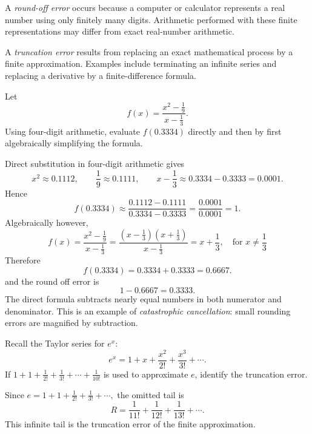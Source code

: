 \begin{definition}
A \emph{round-off error} occurs because a computer or calculator represents a real number using only finitely many digits. Arithmetic performed with these finite representations may differ from exact real-number arithmetic.
\end{definition}

\begin{definition}
A \emph{truncation error} results from replacing an exact mathematical process by a finite approximation. Examples include terminating an infinite series and replacing a derivative by a finite-difference formula.
\end{definition}

\newpage

\begin{example}
Let
\[
  f(x)=\frac{x^2-\frac19}{x-\frac13}.
\]
Using four-digit arithmetic, evaluate $f(0.3334)$ directly and then by first algebraically simplifying the formula.
\end{example}

\begin{solution}[5.6cm]
Direct substitution in four-digit arithmetic gives
\[
  x^2\approx0.1112,\qquad \frac19\approx0.1111,
  \qquad x-\frac13\approx0.3334-0.3333=0.0001.
\]
Hence
\[
  f(0.3334)\approx\frac{0.1112-0.1111}{0.3334-0.3333}
  =\frac{0.0001}{0.0001}=1.
\]
Algebraically however,
\[
    f(x) = \frac{x^2-\frac19}{x-\frac13} = \frac{\left(x-\frac13\right)\left(x+\frac13\right)}{x-\frac13} = x + \frac13, \quad\text{for } x \neq \frac13
\]
Therefore
\[
  f(0.3334)=0.3334+0.3333=0.6667.
\]
and the round off error is
\[
    1 - 0.6667 = 0.3333.
\]
The direct formula subtracts nearly equal numbers in both numerator and denominator. This is an example of \emph{catastrophic cancellation}: small rounding errors are magnified by subtraction.
\end{solution}

\begin{example}
Recall the Taylor series for $e^x$:
\[
 e^x=1+x+\frac{x^2}{2!}+\frac{x^3}{3!}+\cdots.
\]
If 
\(1+1+\frac1{2!}+\frac1{3!}+\cdots+\frac{1}{10!}\)
is used to approximate $e$, identify the truncation error.
\end{example}

\begin{solution}[2.8cm]
Since
\(
 e=1+1+\frac1{2!}+\frac1{3!}+\cdots,
\)
the omitted tail is
\[
 R=\frac1{11!}+\frac1{12!}+\frac1{13!}+\cdots.
\]
This infinite tail is the truncation error of the finite approximation.
\end{solution}


